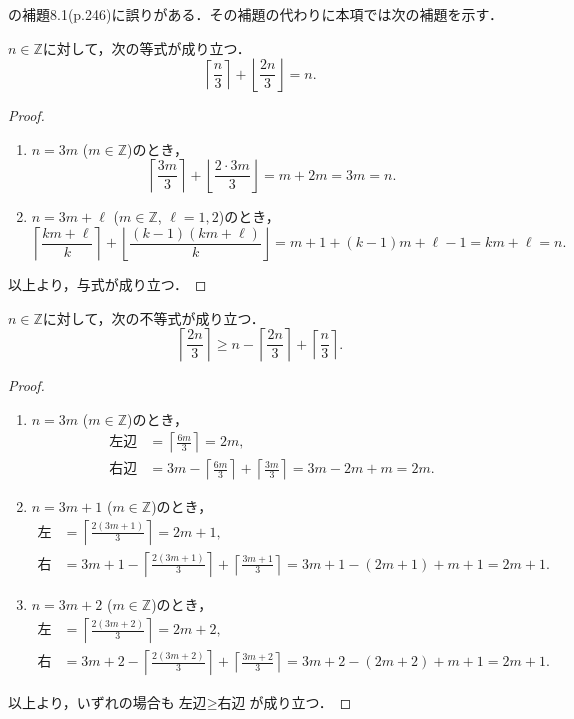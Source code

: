 \cite{miyano-parallel1993}の補題8.1(p.246)に誤りがある．その補題の代わりに本項では次の補題を示す．

\begin{proposition}\label{prop:int1}
$n\in \mathbb{Z}$に対して，次の等式が成り立つ．
$$
  \left\lceil\frac{n}{3}\right\rceil + \left\lfloor\frac{2 n}{3}\right\rfloor = n.
$$
\end{proposition}

\begin{proof}
  \begin{enumerate}
  \item $n = 3m$ ($m \in \mathbb{Z}$)のとき，
  $$\left\lceil\frac{3m}{3}\right\rceil + \left\lfloor\frac{2\cdot 3m}{3}\right\rfloor = m + 2m = 3 m = n.$$
  \item $n = 3m + \ell$ ($m \in \mathbb{Z}$, $\ell = 1,2$)のとき，
  $$\left\lceil\frac{km+\ell}{k}\right\rceil + \left\lfloor\frac{(k-1)(km+\ell)}{k}\right\rfloor = m + 1 + (k-1)m + \ell - 1 = k m + \ell = n.$$
  \end{enumerate}
  以上より，与式が成り立つ．
\end{proof}

\begin{proposition}\label{prop:int2}
  $n\in \mathbb{Z}$に対して，次の不等式が成り立つ．
  $$
  \left\lceil\frac{2n}{3}\right\rceil \geq
  n - \left\lceil\frac{2n}{3}\right\rceil + \left\lceil\frac{n}{3}\right\rceil.
  $$
\end{proposition}
  
\begin{proof}
  \begin{enumerate}
    \item $n = 3m$ ($m \in \mathbb{Z}$)のとき，
    \begin{align*}
    \mbox{左辺} & = \left\lceil\frac{6 m}{3}\right\rceil = 2m,\\
    \mbox{右辺} & = 3 m - \left\lceil\frac{6 m}{3}\right\rceil + \left\lceil\frac{3 m}{3}\right\rceil = 3m - 2m + m = 2m.
    \end{align*}
    \item $n = 3m + 1$ ($m \in \mathbb{Z}$)のとき，
    \begin{align*}
    \mbox{左辺} & = \left\lceil\frac{2(3 m + 1)}{3}\right\rceil = 2m + 1,\\
    \mbox{右辺} & = 3 m + 1 - \left\lceil\frac{2(3 m + 1)}{3}\right\rceil + \left\lceil\frac{3 m + 1}{3}\right\rceil
    = 3 m + 1 - (2m + 1) + m + 1 = 2m + 1.
    \end{align*}
    \item $n = 3m + 2$ ($m \in \mathbb{Z}$)のとき，
    \begin{align*}
    \mbox{左辺} & = \left\lceil\frac{2(3 m + 2)}{3}\right\rceil = 2m + 2,\\
    \mbox{右辺} & = 3 m + 2 - \left\lceil\frac{2(3 m + 2)}{3}\right\rceil + \left\lceil\frac{3 m + 2}{3}\right\rceil
    = 3 m + 2 - (2m + 2) + m + 1 = 2m + 1.
    \end{align*}
  \end{enumerate}
  以上より，いずれの場合も$\mbox{左辺}\geq\mbox{右辺}$が成り立つ．
\end{proof}

